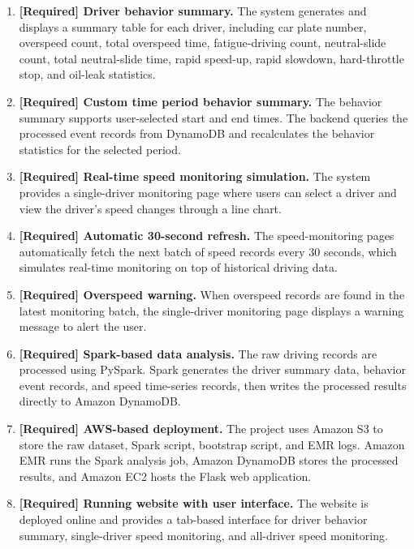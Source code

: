 \documentclass[12pt,a4paper]{article}
\begin{document}
\begin{enumerate}
    \item \textbf{[Required] Driver behavior summary.}
    The system generates and displays a summary table for each driver, including car plate number, overspeed count, total overspeed time, fatigue-driving count, neutral-slide count, total neutral-slide time, rapid speed-up, rapid slowdown, hard-throttle stop, and oil-leak statistics.

    \item \textbf{[Required] Custom time period behavior summary.}
    The behavior summary supports user-selected start and end times. The backend queries the processed event records from DynamoDB and recalculates the behavior statistics for the selected period.

    \item \textbf{[Required] Real-time speed monitoring simulation.}
    The system provides a single-driver monitoring page where users can select a driver and view the driver's speed changes through a line chart.

    \item \textbf{[Required] Automatic 30-second refresh.}
    The speed-monitoring pages automatically fetch the next batch of speed records every 30 seconds, which simulates real-time monitoring on top of historical driving data.

    \item \textbf{[Required] Overspeed warning.}
    When overspeed records are found in the latest monitoring batch, the single-driver monitoring page displays a warning message to alert the user.

    \item \textbf{[Required] Spark-based data analysis.}
    The raw driving records are processed using PySpark. Spark generates the driver summary data, behavior event records, and speed time-series records, then writes the processed results directly to Amazon DynamoDB.

    \item \textbf{[Required] AWS-based deployment.}
    The project uses Amazon S3 to store the raw dataset, Spark script, bootstrap script, and EMR logs. Amazon EMR runs the Spark analysis job, Amazon DynamoDB stores the processed results, and Amazon EC2 hosts the Flask web application.

    \item \textbf{[Required] Running website with user interface.}
    The website is deployed online and provides a tab-based interface for driver behavior summary, single-driver speed monitoring, and all-driver speed monitoring.


\end{enumerate}
\end{document}
